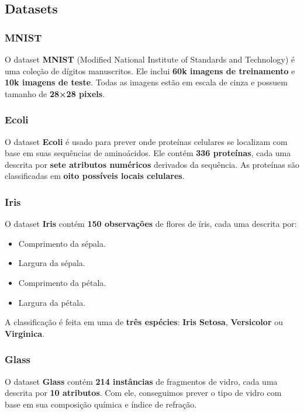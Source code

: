 \documentclass{article}
\begin{document}
\subsection{Datasets}

\subsubsection{MNIST}

O dataset \textbf{MNIST} (Modified National Institute of Standards and Technology) é uma coleção de dígitos manuscritos. Ele inclui \textbf{60k imagens de treinamento} e \textbf{10k imagens de teste}. Todas as imagens estão em escala de cinza e possuem tamanho de \textbf{28×28 pixels}.

\subsubsection{Ecoli}

O dataset \textbf{Ecoli} é usado para prever onde proteínas celulares se localizam com base em suas sequências de aminoácidos. Ele contém \textbf{336 proteínas}, cada uma descrita por \textbf{sete atributos numéricos} derivados da sequência. As proteínas são classificadas em \textbf{oito possíveis locais celulares}.

\subsubsection{Iris}

O dataset \textbf{Iris} contém \textbf{150 observações} de flores de íris, cada uma descrita por:

\begin{itemize}
    \item Comprimento da sépala.
    \item Largura da sépala.
    \item Comprimento da pétala.
    \item Largura da pétala.
\end{itemize}

A classificação é feita em uma de \textbf{três espécies}: \textbf{Iris Setosa}, \textbf{Versicolor} ou \textbf{Virginica}.

\subsubsection{Glass}

O dataset \textbf{Glass} contém \textbf{214 instâncias} de fragmentos de vidro, cada uma descrita por \textbf{10 atributos}. Com ele, conseguimos prever o tipo de vidro com base em sua composição química e índice de refração.
\end{document}
